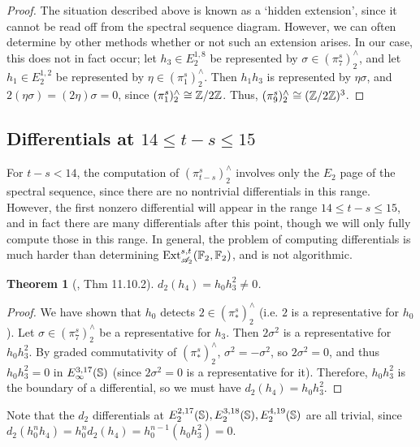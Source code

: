 \documentclass[11pt, titlepage]{article} %
\def\bb{\ensuremath\mathbb}
\def\inte{\ensuremath\mathbb{Z}}
\def\A{\ensuremath{\mathscr{A}_2}}
\DeclareMathOperator{\Ext}{Ext}
\numberwithin{equation}{subsection}
\theoremstyle{plain}
\newtheorem{theorem}{Theorem}[subsection]
\theoremstyle{definition}
\begin{document}
\begin{proof}
The situation described above is known as a `hidden extension', since it cannot be read off from the spectral sequence diagram. However, we can often determine by other methods whether or not such an extension arises. In our case, this does not in fact occur; let \(h_3\in E_2^{1,8}\) be represented by \(\sigma\in (\pi_7^s)^\wedge_2\), and let \(h_1\in E_2^{1,2}\) be represented by \(\eta \in (\pi_1^s)^\wedge_2\). Then \(h_1h_3\) is represented by \(\eta \sigma\), and \(2(\eta \sigma)=(2\eta)\sigma=0\), since \((\pi_1^s)^\wedge_2\cong \inte/2\inte\). Thus, \((\pi_9^s)^\wedge_2\cong (\inte/2\inte)^3\). 
\end{proof}

\subsection{Differentials at \(14\leq t-s\leq 15\)}\label{2504291253}

For \(t-s<14\), the computation of \((\pi_{t-s}^s)^\wedge_2\) involves only the \(E_2\) page of the spectral sequence, since there are no nontrivial differentials in this range.  However, the first nonzero differential will appear in the range \(14\leq t-s\leq15\), and in fact there are many differentials after this point, though we will only fully compute those in this range. In general, the problem of computing differentials is much harder than  determining \(\Ext_{\A}^{s,t}(\bb{F}_2, \bb{F}_2)\), and is not algorithmic. 

\begin{theorem}[{\autocite{rognes2}, Thm 11.10.2}]
\(d_2(h_4)=h_0h_3^2\neq 0\).
\end{theorem}

\begin{proof}
We have shown that \(h_0\) detects \(2\in (\pi_*^s)^\wedge_2\) (i.e. \(2\) is a representative for \(h_0\)). Let \(\sigma\in (\pi_7^s)^\wedge_2\) be a representative for \(h_3\). Then \(2 \sigma^2\) is a representative for \(h_0h_3^2\). By graded commutativity of \((\pi_*^s)^\wedge_2\), \(\sigma^2=-\sigma^2\), so \(2 \sigma^2=0\), and thus \(h_0h_3^2=0\) in \(E_\infty^{3,17}(\bb{S})\) (since \(2\sigma^2=0\) is a representative for it). Therefore, \(h_0h_3^2\) is the boundary of a differential, so we must have \(d_2(h_4)=h_0h_3^2\).
\end{proof}

Note that the \(d_2\) differentials at \(E_2^{2, 17}(\bb{S}),  E_2^{3, 18}(\bb{S}), E_2^{4, 19}(\bb{S})\) are all trivial, since \(d_2(h_0^nh_4)=h_0^nd_2(h_4)=h_0^{n-1}(h_0h_3^2)=0\). 
\end{document}
